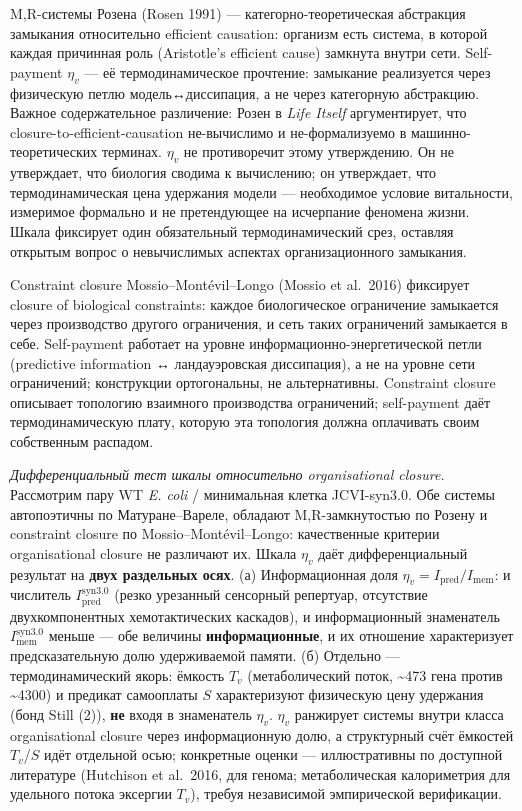 \documentclass[pdflatex,sn-mathphys-ay]{sn-jnl}
\begin{document}
M,R-системы Розена (Rosen 1991) --- категорно-теоретическая абстракция замыкания относительно efficient causation: организм есть система, в которой каждая причинная роль (Aristotle's efficient cause) замкнута внутри сети. Self-payment \(\eta_v\) --- её термодинамическое прочтение: замыкание реализуется через физическую петлю модель↔диссипация, а не через категорную абстракцию. Важное содержательное различение: Розен в \emph{Life Itself} аргументирует, что closure-to-efficient-causation не-вычислимо и не-формализуемо в машинно-теоретических терминах. \(\eta_v\) не противоречит этому утверждению. Он не утверждает, что биология сводима к вычислению; он утверждает, что термодинамическая цена удержания модели --- необходимое условие витальности, измеримое формально и не претендующее на исчерпание феномена жизни. Шкала фиксирует один обязательный термодинамический срез, оставляя открытым вопрос о невычислимых аспектах организационного замыкания.

Constraint closure Mossio--Montévil--Longo (Mossio et al.~2016) фиксирует closure of biological constraints: каждое биологическое ограничение замыкается через производство другого ограничения, и сеть таких ограничений замыкается в себе. Self-payment работает на уровне информационно-энергетической петли (predictive information ↔ ландауэровская диссипация), а не на уровне сети ограничений; конструкции ортогональны, не альтернативны. Constraint closure описывает топологию взаимного производства ограничений; self-payment даёт термодинамическую плату, которую эта топология должна оплачивать своим собственным распадом.

\emph{Дифференциальный тест шкалы относительно organisational closure.} Рассмотрим пару WT \emph{E. coli} / минимальная клетка JCVI-syn3.0. Обе системы автопоэтичны по Матуране--Вареле, обладают M,R-замкнутостью по Розену и constraint closure по Mossio--Montévil--Longo: качественные критерии organisational closure не различают их. Шкала \(\eta_v\) даёт дифференциальный результат на \textbf{двух раздельных осях}. (а) Информационная доля \(\eta_v = I_{\text{pred}}/I_{\text{mem}}\): и числитель \(I_{\text{pred}}^{\text{syn3.0}}\) (резко урезанный сенсорный репертуар, отсутствие двухкомпонентных хемотактических каскадов), и информационный знаменатель \(I_{\text{mem}}^{\text{syn3.0}}\) меньше --- обе величины \textbf{информационные}, и их отношение характеризует предсказательную долю удерживаемой памяти. (б) Отдельно --- термодинамический якорь: ёмкость \(T_v\) (метаболический поток, \textasciitilde473 гена против \textasciitilde4300) и предикат самооплаты \(S\) характеризуют физическую цену удержания (бонд Still (2)), \textbf{не} входя в знаменатель \(\eta_v\). \(\eta_v\) ранжирует системы внутри класса organisational closure через информационную долю, а структурный счёт ёмкостей \(T_v\)/\(S\) идёт отдельной осью; конкретные оценки --- иллюстративны по доступной литературе (Hutchison et al.~2016, для генома; метаболическая калориметрия для удельного потока эксергии \(T_v\)), требуя независимой эмпирической верификации.
\end{document}
